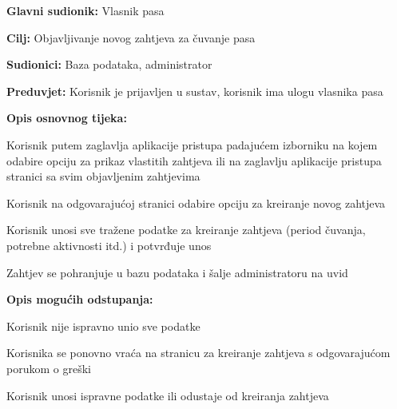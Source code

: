 					\noindent {}
					\begin{packed_item}
						
						\item \textbf{Glavni sudionik: } Vlasnik pasa
						\item  \textbf{Cilj:} Objavljivanje novog zahtjeva za čuvanje pasa
						\item  \textbf{Sudionici:} Baza podataka, administrator
						\item  \textbf{Preduvjet:} Korisnik je prijavljen u sustav, korisnik ima ulogu vlasnika pasa
						\item  \textbf{Opis osnovnog tijeka:}
						
						\item[] \begin{packed_enum}
							\item Korisnik putem zaglavlja aplikacije pristupa padajućem izborniku na kojem odabire opciju za prikaz vlastitih zahtjeva ili na zaglavlju aplikacije pristupa stranici sa svim objavljenim zahtjevima
							\item Korisnik na odgovarajućoj stranici odabire opciju za kreiranje novog zahtjeva
							\item Korisnik unosi sve tražene podatke za kreiranje zahtjeva (period čuvanja, potrebne aktivnosti itd.) i potvrđuje unos
							\item Zahtjev se pohranjuje u bazu podataka i šalje administratoru na uvid
							
						\end{packed_enum}
						
						\item  \textbf{Opis mogućih odstupanja:}
						
						\item[] \begin{packed_item}
							
							\item[3.a] Korisnik nije ispravno unio sve podatke
							\item[] \begin{packed_enum}
								
								\item Korisnika se ponovno vraća na stranicu za kreiranje zahtjeva s odgovarajućom porukom o greški
								\item Korisnik unosi ispravne podatke ili odustaje od kreiranja zahtjeva
								
							\end{packed_enum}
						\end{packed_item}
					\end{packed_item}		
				
